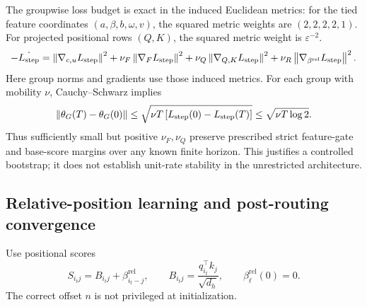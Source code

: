 The groupwise loss budget is exact in the induced Euclidean metrics:
for the tied feature coordinates $(a,\beta,b,\omega,v)$, the squared
metric weights are $(2,2,2,2,1)$. For projected positional rows $(Q,K)$,
the squared metric weight is $\varepsilon^{-2}$.
\begin{equation}\label{eq:lr-mobility-budget}
 -\dot{L_{\mathrm{step}}}=
 \left\lVert \nabla_{c,u}L_{\mathrm{step}}\right\rVert^2
 +\nu_F\left\lVert \nabla_FL_{\mathrm{step}}\right\rVert^2
 +\nu_Q\left\lVert \nabla_{Q,K}L_{\mathrm{step}}\right\rVert^2
 +\nu_R\left\lVert \nabla_{\beta^{\mathrm{rel}}}L_{\mathrm{step}}\right\rVert^2.
\end{equation}
Here group norms and gradients use those induced metrics. For each group
with mobility $\nu$, Cauchy--Schwarz implies
\begin{equation}\label{eq:lr-movement-budget}
 \left\lVert \theta_G(T)-\theta_G(0)\right\rVert
 \le\sqrt{\nu T\,[L_{\mathrm{step}}(0)-L_{\mathrm{step}}(T)]}
 \le\sqrt{\nu T\log2}.
\end{equation}
Thus sufficiently small but positive $\nu_F,\nu_Q$ preserve prescribed
strict feature-gate and base-score margins over any known finite horizon.
This justifies a controlled bootstrap; it does not establish unit-rate
stability in the unrestricted architecture.

\subsection{Relative-position learning and post-routing convergence}
\label{app:weak-routing-convergence}

Use positional scores
\begin{equation}\label{eq:lr-relative-scores}
 S_{i_tj}=B_{i_tj}+\beta_{i_t-j}^{\mathrm{rel}},
 \qquad
 B_{i_tj}=\frac{q_{i_t}^\top k_j}{\sqrt{d_h}},
 \qquad \beta_\ell^{\mathrm{rel}}(0)=0.
\end{equation}
The correct offset $n$ is not privileged at initialization.

